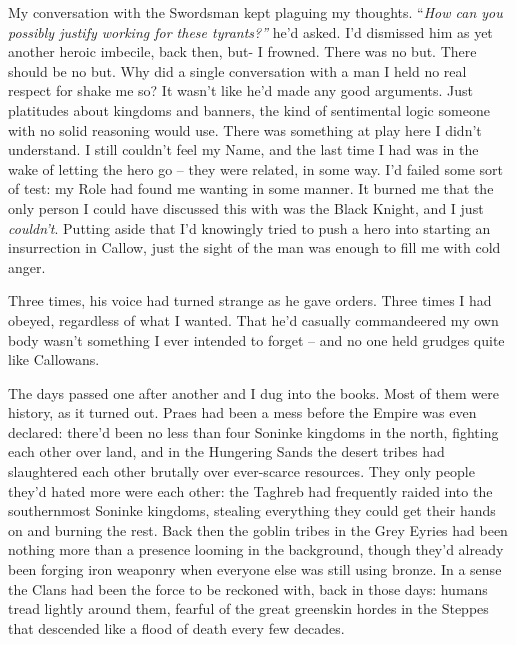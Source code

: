 \documentclass[12pt, openany]{book}
\begin{document}
My conversation with the Swordsman kept plaguing my thoughts. “\textit{How can you possibly justify working for these tyrants?” }he’d asked.\textit{ }I’d dismissed him as yet another heroic imbecile, back then, but- I frowned. There was no but. There should be no but. Why did a single conversation with a man I held no real respect for shake me so? It wasn’t like he’d made any good arguments. Just platitudes about kingdoms and banners, the kind of sentimental logic someone with no solid reasoning would use. There was something at play here I didn’t understand. I still couldn’t feel my Name, and the last time I had was in the wake of letting the hero go – they were related, in some way. I’d failed some sort of test: my Role had found me wanting in some manner. It burned me that the only person I could have discussed this with was the Black Knight, and I just \textit{couldn’t}. Putting aside that I’d knowingly tried to push a hero into starting an insurrection in Callow, just the sight of the man was enough to fill me with cold anger.

Three times, his voice had turned strange as he gave orders. Three times I had obeyed, regardless of what I wanted. That he’d casually commandeered my own body wasn’t something I ever intended to forget – and no one held grudges quite like Callowans.

The days passed one after another and I dug into the books. Most of them were history, as it turned out. Praes had been a mess before the Empire was even declared: there’d been no less than four Soninke kingdoms in the north, fighting each other over land, and in the Hungering Sands the desert tribes had slaughtered each other brutally over ever-scarce resources. They only people they’d hated more were each other: the Taghreb had frequently raided into the southernmost Soninke kingdoms, stealing everything they could get their hands on and burning the rest. Back then the goblin tribes in the Grey Eyries had been nothing more than a presence looming in the background, though they’d already been forging iron weaponry when everyone else was still using bronze. In a sense the Clans had been the force to be reckoned with, back in those days: humans tread lightly around them, fearful of the great greenskin hordes in the Steppes that descended like a flood of death every few decades. 
\end{document}

